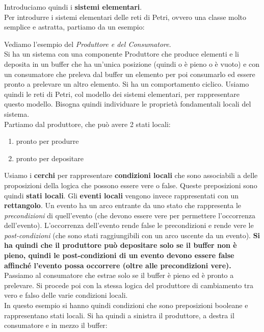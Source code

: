 Introduciamo quindi i \textbf{sistemi elementari}.\\
Per introdurre i sistemi elementari delle reti di Petri, ovvero una classe molto
semplice e astratta, partiamo da un esempio:
\begin{esempio}
  Vediamo l'esempio del \textit{Produttore e del Consumatore}.\\
  Si ha un sistema con una componente Produttore che produce elementi e li
  deposita in un buffer che ha un'unica posizione (quindi o è pieno o è vuoto) e
  con un consumatore che preleva dal buffer un elemento per poi consumarlo ed
  essere pronto a prelevare un altro elemento. Si ha un comportamento
  ciclico. Usiamo quindi le reti di Petri, col modello dei sistemi elementari,
  per rappresentare questo modello. Bisogna quindi individuare le proprietà
  fondamentali locali del sistema.\\
  Partiamo dal produttore, che può avere 2 stati locali:
  \begin{enumerate}
    \item pronto per produrre
    \item pronto per depositare
  \end{enumerate}
  Usiamo i \textbf{cerchi} per rappresentare \textbf{condizioni locali} che sono
  associabili a delle proposizioni della logica che possono essere vere o
  false. Queste preposizioni sono quindi \textbf{stati locali}. Gli \textbf{eventi locali} vengono
  invece rappresentati con un \textbf{rettangolo}. Un evento ha un arco entrante
  da uno stato che rappresenta le \textit{precondizioni} di quell'evento (che
  devono essere vere per permettere l'occorrenza dell'evento). L'occorrenza
  dell'evento rende false le precondizioni e rende vere le
  \textit{post-condizioni} (che sono stati raggiungibili con un arco uscente da
  un evento). \textbf{Si ha quindi che il produttore può depositare solo se il buffer
  non è pieno, quindi le post-condizioni di un evento devono essere false
  affinché l'evento possa occorrere (oltre alle precondizioni vere).}\\
  Passiamo al consumatore che estrae solo se il buffer è pieno ed è pronto a
  prelevare. Si procede poi con la stessa logica del produttore di cambiamento
  tra vero e falso delle varie condizioni locali.\\
  In questo esempio si hanno quindi condizioni che sono preposizioni booleane e
  rappresentano stati locali. Si ha quindi a sinistra il produttore, a destra il
  consumatore e in mezzo il buffer:
  \begin{center}
\end{center}
\end{esempio}
